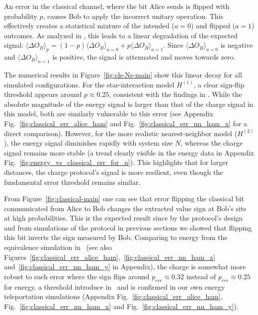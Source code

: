 An error in the classical channel, where the bit Alice sends is flipped with probability $p$, causes Bob to apply the incorrect unitary operation. This effectively creates a statistical mixture of the intended ($a=0$) and flipped ($a=1$) outcomes. As analyzed in \cite{QKDbyQET}, this leads to a linear degradation of the expected signal: $\langle\Delta O_B\rangle_p = (1-p)\langle\Delta O_B\rangle_{a=0} + p\langle\Delta O_B\rangle_{a=1}$. Since $\langle\Delta O_B\rangle_{a=0}$ is negative and $\langle\Delta O_B\rangle_{a=1}$ is positive, the signal is attenuated and moves towards zero.

The numerical results in Figure~\ref{fig:cls-Ns-main} show this linear decay for all simulated configurations. For the star-interaction model $H^{(1)}$, a clear sign-flip threshold appears around $p \approx 0.25$, consistent with the findings in \cite{QKDbyQET}. While the absolute magnitude of the energy signal is larger than that of the charge signal in this model, both are similarly vulnerable to this error (see Appendix Fig.~\ref{fig:classical_err_alice_ham} and Fig.~\ref{fig:classical_err_nn_ham_x} for a direct comparison). However, for the more realistic nearest-neighbor model ($H^{(2)}$), the energy signal diminishes rapidly with system size $N$, whereas the charge signal remains more stable (a trend clearly visible in the energy data in Appendix Fig.~\ref{fig:energy_vs_classical_err_for_n}). This highlights that for larger distances, the charge protocol's signal is more resilient, even though the fundamental error threshold remains similar.

From Figure~\ref{fig:classical-main} one can see that error flipping the classical bit communicated from Alice to Bob changes the extracted value sign at Bob's site at high probabilities. This is the expected result since by the protocol's design and from simulations of the protocol in previous sections we showed that flipping this bit inverts the sign measured by Bob. Comparing to energy from the equivalence simulation in~\cite{QKDbyQET} (see also Figures~\ref{fig:classical_err_alice_ham},~\ref{fig:classical_err_nn_ham_x} and~\ref{fig:classical_err_nn_ham_y} in Appendix), the charge is somewhat more robust to such error where the sign flips around \(p_{err} \approx  0.32\) instead of \(p_{err} \approx  0.25\) for energy, a threshold introduce in~\cite{QKDbyQET} and is confirmed in our own energy teleportation simulations (Appendix Fig.~\ref{fig:classical_err_alice_ham}, Fig.~\ref{fig:classical_err_nn_ham_x} and Fig.~\ref{fig:classical_err_nn_ham_y}).

